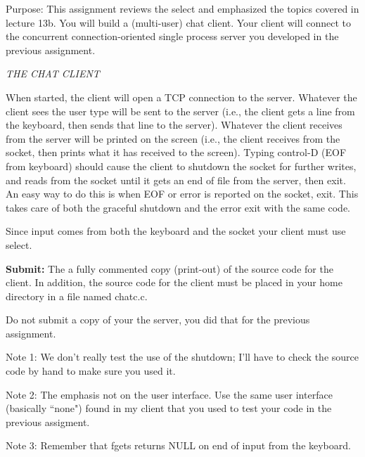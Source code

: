 

\parindent 0pt

Purpose: This assignment reviews the select and emphasized the
topics covered in lecture 13b.
You will build a (multi-user) chat client.
Your client will connect to the concurrent connection-oriented single process
server you developed in the previous assignment.

{\it THE CHAT CLIENT}

When started, the client will open a TCP connection to the server.
Whatever the client sees the user type will be sent to the server 
(i.e., the client gets a line from the keyboard, 
then sends that line to the server).
Whatever the client receives from the server will be printed on the screen
(i.e., the client receives from the socket, 
then prints what it has received to the screen).
Typing control-D (EOF from keyboard) should cause the client to 
shutdown the socket for further writes, and reads from the socket until
it gets an end of file from the server, then exit.
An easy way to do this is when EOF or error is reported on the socket, exit.
This takes care of both the graceful shutdown and the error exit
with the same code.

Since input comes from both the keyboard and the socket your client
must use select.

{\bf Submit:} The a fully commented copy (print-out) of the source code for the 
client.
In addition,
the source code for the client must be placed in your home directory
in a file named {\ltt{}chatc.c}.

Do not submit a copy of your the server,
you did that for the previous assignment.

Note 1: We don't really test the use of the shutdown; I'll have to
check the source code by hand to make sure you used it.

Note 2: The emphasis not on the user interface.
Use the same user interface (basically ``none") found in my client
that you used to test your code in the previous assigment.

Note 3: Remember that {\ltt{}fgets} returns {\ltt{}NULL} on end
of input from the keyboard.

\bye
